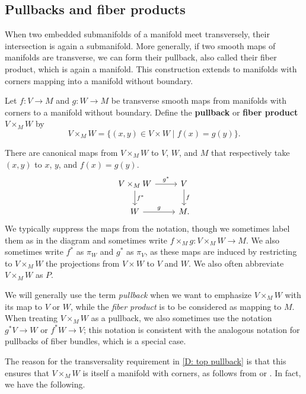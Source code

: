\subsection{Pullbacks and fiber products}

When two embedded submanifolds of a manifold meet transversely, their intersection is again a submanifold.
More generally, if two smooth maps of manifolds are transverse, we can form their pullback, also called their fiber product, which is again a manifold.
This construction extends to manifolds with corners mapping into a manifold without boundary.

\begin{definition}\label{D: top pullback}
	Let $f \colon V \to M$ and $g \colon W \to M$ be transverse smooth maps from manifolds with corners to a manifold without boundary.
	Define the \textbf{pullback} or \textbf{fiber product} $V \times_M W$ by
	$$V \times_M W = \{(x, y) \in V \times W \mid f(x) = g(y)\}.$$

	There are canonical maps from $V \times_M W$ to $V$, $W$, and $M$ that respectively take $(x,y)$ to $x$, $y$, and $f(x) = g(y)$.
	\[
	\begin{tikzcd}
		V \times_M W \arrow[r, "g^*"] \arrow[d, "f^*"] & V \arrow[d, "f"] \\
		W \arrow[r, "g"] & M.
	\end{tikzcd}
	\]
	We typically suppress the maps from the notation, though we sometimes label them as in the diagram and sometimes write $f \times_M g \colon V \times_M W \to M$.
	We also sometimes write $f^*$ as $\pi_W$ and $g^*$ as $\pi_V$, as these maps are induced by restricting to $V \times_MW$ the projections from $V \times W$ to $V$ and $W$.
	We also often abbreviate $V \times_M W$ as $P$.

	We will generally use the term \textit{pullback} when we want to emphasize $V \times_M W$ with its map to $V$ or $W$, while the \textit{fiber product} is to be considered as mapping to $M$.
	When treating $V \times_M W$ as a pullback, we also sometimes use the notation $g^*V \to W$ or $f^*W \to V$; this notation is consistent with the analogous notation for pullbacks of fiber bundles, which is a special case.
\end{definition}

The reason for the transversality requirement in \cref{D: top pullback} is that this ensures that $V\times_MW$ is itself a manifold with corners, as follows from \cite[Theorem 7.2.7]{MaDo92} or \cite[Theorem 6.4]{Joy12}. In fact, we have the following.


